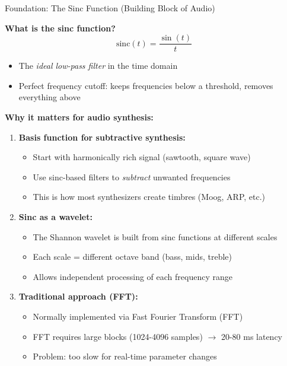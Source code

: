 \documentclass[aspectratio=169,11pt]{beamer}
\begin{document}
\begin{frame}{Foundation: The Sinc Function (Building Block of Audio)}

\textbf{What is the sinc function?}
\[
\text{sinc}(t) = \frac{\sin(t)}{t}
\]
\begin{itemize}
    \item The \emph{ideal low-pass filter} in the time domain
    \item Perfect frequency cutoff: keeps frequencies below a threshold, removes everything above
\end{itemize}

\vspace{0.3cm}

\textbf{Why it matters for audio synthesis:}
\begin{enumerate}
    \item \textbf{Basis function for subtractive synthesis:}
    \begin{itemize}
        \item Start with harmonically rich signal (sawtooth, square wave)
        \item Use sinc-based filters to \emph{subtract} unwanted frequencies
        \item This is how most synthesizers create timbres (Moog, ARP, etc.)
    \end{itemize}
    
    \vspace{0.2cm}
    
    \item \textbf{Sinc as a wavelet:}
    \begin{itemize}
        \item The Shannon wavelet is built from sinc functions at different scales
        \item Each scale = different octave band (bass, mids, treble)
        \item Allows independent processing of each frequency range
    \end{itemize}
    
    \vspace{0.2cm}
    
    \item \textbf{Traditional approach (FFT):}
    \begin{itemize}
        \item Normally implemented via Fast Fourier Transform (FFT)
        \item FFT requires large blocks (1024-4096 samples) $\rightarrow$ 20-80 ms latency
        \item Problem: too slow for real-time parameter changes
    \end{itemize}
\end{enumerate}


\end{frame}
\end{document}
